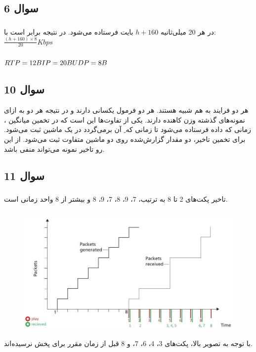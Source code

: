 \documentclass{article}
\begin{document}
\subsection{سوال 6}
\subsubsection{}
در هر 20 میلی‌ثانیه $h + 160$ بایت فرستاده می‌شود. در نتیجه  برابر است با:
$
\frac{(h+160)\times 8}{20}Kbps
$

\subsubsection{}
$
RTP = 12 B \\
IP = 20 B \\
UDP = 8 B
$

\subsection{سوال 10}
هر دو فرایند به هم شبیه هستند. هر دو فرمول یکسانی دارند و در نتیجه هر دو به ازای نمونه‌های گذشته وزن کاهنده دارند. یکی از تفاوت‌ها این است که در تخمین میانگین ، زمانی که داده فرستاده می‌شود تا زمانی که ِ آن برمی‌گردد در یک ماشین ثبت می‌شود. برای تخمین تاخیر، دو مقدار گزارش‌شده روی دو ماشین متفاوت ثبت می‌شود. از این رو تاخیر نمونه می‌تواند منفی باشد.


\subsection{سوال 11}
\subsubsection{}
تاخیر پکت‌های 2 تا 8 به ترتیب، 7، 9، 8، 7، 9، 8 و بیشتر از 8 واحد زمانی است.

\subsubsection{}
\begin{figure}[H]
    \centering
    \includegraphics[width=1.0\textwidth]{figures/11b.jpg}
    \caption
	{}
    \label{fig:fig1}
\end{figure}
با توجه به تصویر بالا، پکت‌های 3، 4، 6، 7، و 8 قبل از زمان مقرر برای پخش نرسیده‌اند.
\end{document}
